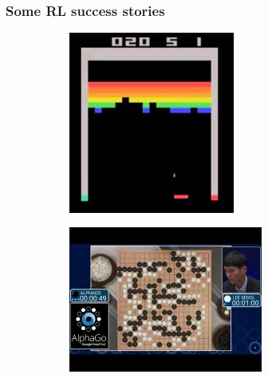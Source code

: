 \begin{frame}
    \frametitle{Some RL success stories}
    \begin{figure}[!ht]
        \centering
        \begin{subfigure}{0.4\textwidth}
            \centering
            \href{https://youtu.be/TmPfTpjtdgg}{\includegraphics[width=0.6\textwidth]{./imgs/img_motivation_dqn_atari.png}}
            \caption{\cite{DQNAtari}}
        \end{subfigure}
        \begin{subfigure}{0.4\textwidth}
            \centering
            \href{https://youtu.be/jGyCsVhtW0M}{\includegraphics[width=0.7\textwidth]{./imgs/img_motivation_alpha_go.png}}
            \caption{\cite{AlphaGo}}
        \end{subfigure}


\end{figure}
\end{frame}
